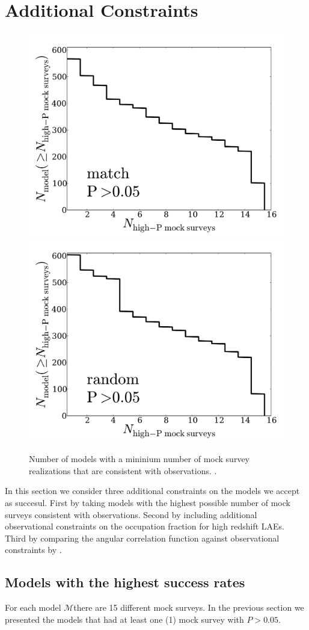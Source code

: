\documentclass[usenatbib]{mn2e}
\begin{document}
\section{Additional Constraints}

\begin{figure}
\begin{center}
\includegraphics[width=0.46\linewidth,angle=0]{./plots/Fig4_match_P5.pdf}
\hspace{5mm}
\includegraphics[width=0.46\linewidth,angle=0]{./plots/Fig4_random_P5.pdf}
\end{center} 
\caption{ Number of models with a mininium number of mock survey
  realizations that are consistent with observations.
  \label{fig:high_success_rate}.}  
\end{figure}
 
In this section we consider three additional constraints on the models
we accept as succesul. First by taking models with the
highest possible number of mock surveys consistent with
observations. Second by including additional observational constraints
on the occupation fraction for high redshift LAEs. Third by comparing
the angular correlation function against observational constraints by
\cite{Hayashino2004}. 

\subsection{Models with the highest success rates}

For each model ${\mathcal M}$there are 15 different mock surveys. In the
previous section we presented the models that had at least one (1)
mock survey with $P>0.05$.
\end{document}
